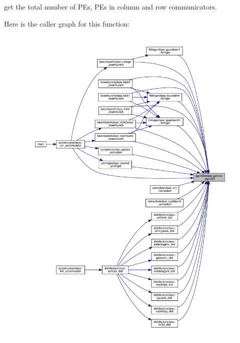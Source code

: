 get the total number of P\+Es, P\+Es in column and row communicators. 

Here is the caller graph for this function\+:\nopagebreak
\begin{figure}[H]
\begin{center}
\leavevmode
\includegraphics[width=350pt]{namespacepgrid2dclass_ac088657db5b1deb05bb1ec732579ba53_icgraph}
\end{center}
\end{figure}
